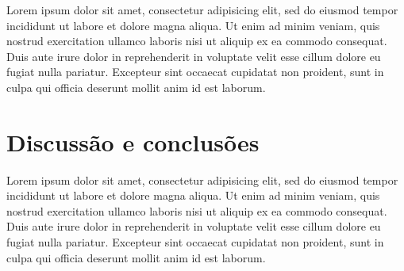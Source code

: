 \documentclass[12pt]{article}
\begin{document}
Lorem ipsum dolor sit amet, consectetur adipisicing elit, sed do eiusmod tempor incididunt ut labore et dolore magna aliqua. Ut enim ad minim veniam, quis nostrud exercitation ullamco laboris nisi ut aliquip ex ea commodo consequat. Duis aute irure dolor in reprehenderit in voluptate velit esse cillum dolore eu fugiat nulla pariatur. Excepteur sint occaecat cupidatat non proident, sunt in culpa qui officia deserunt mollit anim id est laborum.

\section{Discussão e conclusões} \label{sec:conclusions}

Lorem ipsum dolor sit amet, consectetur adipisicing elit, sed do eiusmod tempor incididunt ut labore et dolore magna aliqua. Ut enim ad minim veniam, quis nostrud exercitation ullamco laboris nisi ut aliquip ex ea commodo consequat. Duis aute irure dolor in reprehenderit in voluptate velit esse cillum dolore eu fugiat nulla pariatur. Excepteur sint occaecat cupidatat non proident, sunt in culpa qui officia deserunt mollit anim id est laborum.



\end{document}
